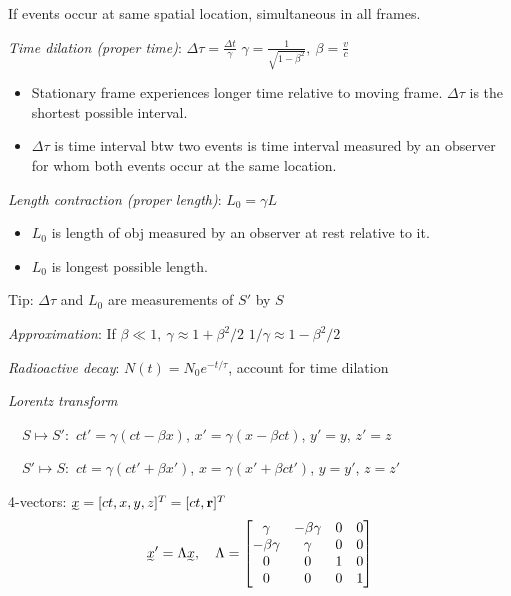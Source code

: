 \documentclass[twocolumn]{article}
\begin{document}
If events occur at same spatial location, simultaneous in all frames.

\vspace{-.5em}
\dotfill

\textit{Time dilation (proper time)}: $\Delta \tau = \frac{\Delta t}{\gamma}$ \hfill $\gamma = \frac{1}{\sqrt{1 - \beta^2}},\ \beta = \frac{v}{c}$

\vspace{-.5em}
\begin{itemize}
    \item Stationary frame experiences longer time relative to moving frame. $\Delta \tau$ is the shortest possible interval.
    \item $\Delta \tau$ is time interval btw two events is time interval measured by an observer for whom both events occur at the same location.
\end{itemize} \vspace{-.5em}

\textit{Length contraction (proper length)}: $L_0 = \gamma L$
\vspace{-.5em}
\begin{itemize}
    \item $L_0$ is length of obj measured by an observer at rest relative to it.
    \item $L_0$ is longest possible length.
\end{itemize} \vspace{-.5em}

Tip: $\Delta \tau$ and $L_0$ are measurements of $S'$ by $S$

\textit{Approximation}: If $\beta \ll 1,\ \gamma \approx 1 + \beta^2/2$ \hfill $1/\gamma \approx 1 - \beta^2/2$

\textit{Radioactive decay}: $N(t) = N_0 e^{-t/\tau}$, \hfill account for time dilation

\vspace{-.5em}
\dotfill

\textit{Lorentz transform}

$\quad S \mapsto S':$ \hfill $ct' = \gamma (ct - \beta x)$, \hfill $x' = \gamma (x - \beta c t)$, \hfill $y' = y$, \hfill $z' = z$

$\quad S' \mapsto S:$ \hfill $ct = \gamma(ct' + \beta x')$, \hfill $x = \gamma(x' + \beta c t')$, \hfill $y = y'$, \hfill $z = z'$

4-vectors: $\undertilde{x} = [ct, x, y, z]^T = [ct, \mathbf{r}]^T$
\begin{equation*}
    \undertilde{x}' = \Lambda \undertilde{x}, \quad \Lambda = \begin{bmatrix} \gamma & -\beta \gamma & 0 & 0 \\ - \beta \gamma & \gamma & 0 & 0 \\ 0 & 0 & 1 & 0 \\ 0 & 0 & 0 & 1 \end{bmatrix}
\end{equation*} \vspace{-1em}
\end{document}

